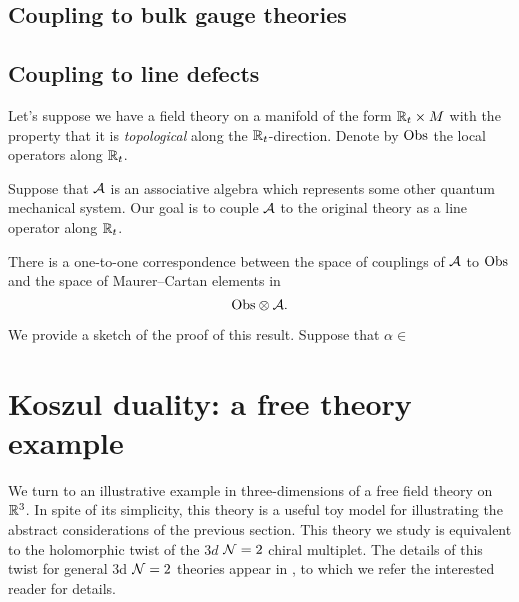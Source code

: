 \documentclass[11pt]{amsart}
\def\brian#1{{\textcolor{blue!65!red}{BRW: {#1}}}}
\begin{document}
\subsection*{Coupling to bulk gauge theories}

\subsection{Coupling to line defects} 

Let's suppose we have a field theory on a manifold of the form $\mathbb R_t \times M$ with the property that it is {\em topological} along the $\mathbb R_t$-direction. 
Denote by ${\rm Obs}$ the local operators along $\mathbb R_t$. 

Suppose that $\mathcal A$ is an associative algebra which represents some other quantum mechanical system. 
Our goal is to couple $\mathcal A$ to the original theory as a line operator along $\mathbb R_t$. 

\begin{prop}\label{prop:line}
There is a one-to-one correspondence between the space of couplings of $\mathcal A$ to ${\rm Obs}$ and the space of Maurer--Cartan elements in 
\[
{\rm Obs} \otimes \mathcal A .
\]
\end{prop}

We provide a sketch of the proof of this result. 
Suppose that $\alpha \in $



\section{Koszul duality: a free theory example}


We turn to an illustrative example in three-dimensions of a free field theory on $\mathbb R^3$. In spite of its simplicity, this theory is a useful toy model for illustrating the abstract considerations of the previous section. 
This theory we study is equivalent to the holomorphic twist of the $3d$ $\mathcal N=2$ chiral multiplet. The details of this twist for general 3d $\mathcal N=2$ theories appear in \cite{CDG20}, to which we refer the interested reader for details. 
\end{document}
